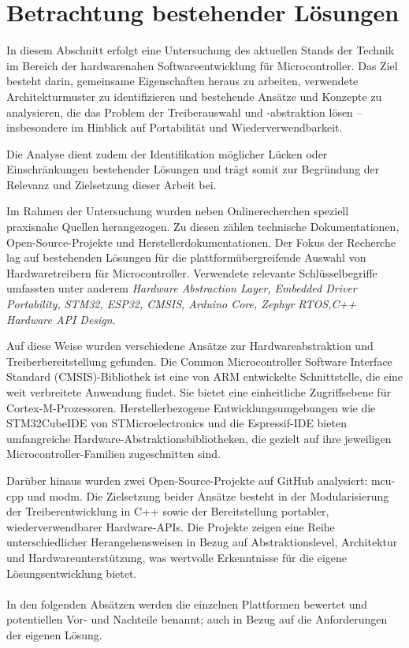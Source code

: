 \section{Betrachtung bestehender Lösungen}
In diesem Abschnitt erfolgt eine Untersuchung des aktuellen Stands der Technik im Bereich der hardwarenahen Softwareentwicklung für Microcontroller.
Das Ziel besteht darin, gemeinsame Eigenschaften heraus zu arbeiten, verwendete Architekturmuster zu identifizieren und bestehende Ansätze und Konzepte zu analysieren, die das Problem der Treiberauswahl und -abstraktion lösen – insbesondere im Hinblick auf Portabilität und Wiederverwendbarkeit. 

Die Analyse dient zudem der Identifikation möglicher Lücken oder Einschränkungen bestehender Lösungen und trägt somit zur Begründung der Relevanz und Zielsetzung dieser Arbeit bei.

Im Rahmen der Untersuchung wurden neben Onlinerecherchen speziell praxisnahe Quellen herangezogen. 
Zu diesen zählen technische Dokumentationen, Open-Source-Projekte und Herstellerdokumentationen.
Der Fokus der Recherche lag auf bestehenden Lösungen für die plattformübergreifende Auswahl von Hardwaretreibern für Microcontroller.
Verwendete relevante Schlüsselbegriffe umfassten unter anderem \textit{Hardware Abstraction Layer, Embedded Driver Portability, STM32, ESP32, CMSIS, Arduino Core, Zephyr RTOS,C++ Hardware API Design}.

Auf diese Weise wurden verschiedene Ansätze zur Hardwareabstraktion und Treiberbereitstellung gefunden.
Die Common Microcontroller Software Interface Standard (CMSIS)-Bibliothek ist eine von ARM entwickelte Schnittstelle, die eine weit verbreitete Anwendung findet. 
Sie bietet eine einheitliche Zugriffsebene für Cortex-M-Prozessoren. 
Herstellerbezogene Entwicklungsumgebungen wie die STM32CubeIDE von STMicroelectronics und die Espressif-IDE bieten umfangreiche Hardware-Abstraktionsbibliotheken, die gezielt auf ihre jeweiligen Microcontroller-Familien zugeschnitten sind.

Darüber hinaus wurden zwei Open-Source-Projekte auf GitHub analysiert: mcu-cpp und modm. 
Die Zielsetzung beider Ansätze besteht in der Modularisierung der Treiberentwicklung in C++ sowie der Bereitstellung portabler, wiederverwendbarer Hardware-APIs. 
Die Projekte zeigen eine Reihe unterschiedlicher Herangehensweisen in Bezug auf Abstraktionslevel, Architektur und Hardwareunterstützung, was wertvolle Erkenntnisse für die eigene Lösungsentwicklung bietet.
\\
\\
In den folgenden Absätzen werden die einzelnen Plattformen bewertet und potentiellen Vor- und Nachteile benannt; auch in Bezug auf die Anforderungen der eigenen Lösung. 


